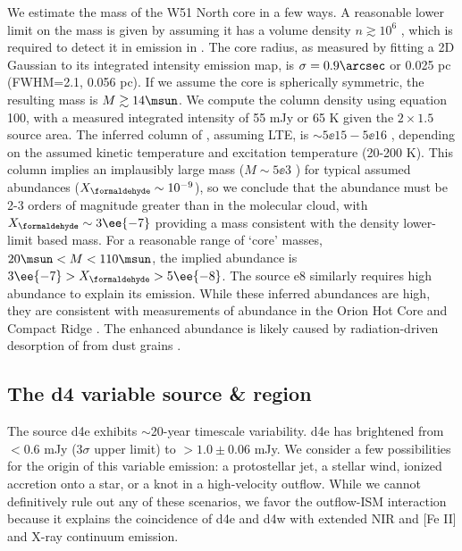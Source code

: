 We estimate the mass of the W51 North core in a few ways.  A reasonable lower limit
on the mass is given by assuming it has a volume density $n\gtrsim10^6$ \percc,
which is required to detect it in emission in \ortho \twotwo
\citep{Mangum1993a}.  The core radius, as measured by fitting a 2D Gaussian to
its integrated intensity emission map, is
$\sigma=0.9\arcsec$ or 0.025 pc (FWHM=2.1\arcsec, 0.056 pc).  If we assume the core
is spherically symmetric, the resulting mass is $M\gtrsim14\msun$.
We compute the \ortho \twotwo column density using \citet{Mangum2015a} equation
100, with a measured integrated intensity of 55 mJy \kms or 65 K \kms given
the $2\times1.5$\arcsec source area.  The inferred column of \ortho,
assuming LTE, is $\sim5\ee{15} - 5\ee{16}$ \persc, depending on the assumed
kinetic temperature and excitation temperature (20-200 K).  This \formaldehyde column
implies an implausibly large mass ($M\sim5\ee{3}$ \msun) for typical assumed abundances
($X_{\formaldehyde}\sim10^{-9}$), so we conclude that the \formaldehyde abundance
must be 2-3 orders of magnitude greater than in the molecular cloud, with
$X_{\formaldehyde}\sim3\ee{-7}$ providing a mass consistent with the density
lower-limit based mass.  For a reasonable range of `core' masses, $20
\msun<M<110 \msun$, the implied abundance is $3\ee{-7} > X_{\formaldehyde} >
5\ee{-8}$.  The source e8 similarly requires high abundance to explain its
emission.  While these inferred abundances are high, they are consistent with
measurements of \formaldehyde abundance in the Orion Hot Core and Compact Ridge
\citep{Mangum1993b}.  The enhanced abundance is likely caused by radiation-driven
desorption of \formaldehyde from dust grains \citep{Shalabiea1994a,van-Dishoeck1998b}.






\subsection{The d4 variable source \& \hh region}
\label{sec:d4}
The source d4e exhibits $\sim$20-year timescale variability.  d4e has
brightened from $<0.6$ mJy ($3\sigma$ upper limit) to $>1.0\pm0.06$ mJy.  We
consider a few possibilities for the origin of this variable emission: a
protostellar jet,  a stellar wind, ionized accretion onto a star, or a knot in
a high-velocity outflow.  While we cannot definitively rule out any of these
scenarios, we favor the outflow-ISM interaction because it explains the
coincidence of d4e and d4w with extended NIR \hh and [Fe II] and X-ray
continuum emission.

